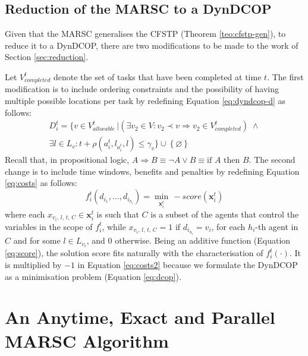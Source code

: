 \subsection{Reduction of the MARSC to a DynDCOP}\label{sec:reduction2}

Given that the MARSC generalises the CFSTP (Theorem \ref{teo:cfstp-gen}), to reduce it to
a DynDCOP, there are two modifications to be made to the work of Section
\ref{sec:reduction}.

Let $V^t_{completed}$ denote the set of tasks that have been completed at time $t$. The
first modification is to include ordering constraints and the possibility of having
multiple possible locations per task by redefining Equation \ref{eq:dyndcop-d} as follows:
\begin{equation}
    \begin{gathered}
    D_i^t = \big\{
        v \in V^t_{allocable} \,|
        \left(\exists v_2 \in V : v_2 \prec v \Rightarrow v_2 \in V^t_{completed} \right)
        \;\land\\ \exists l \in L_v : t + \rho(a_i^t, l_{a_i^t}, l) \leq \gamma_v \big\}
        \cup \left\{ \varnothing \right\}
    \end{gathered}
\end{equation}
Recall that, in propositional logic, $A \Rightarrow B \equiv \neg A \lor B \equiv
\text{if } A \text{ then } B$.
The second change is to include time windows, benefits and penalties by redefining
Equation \ref{eq:costs} as follows:
\begin{equation}\label{eq:costs2}
    f_i^t(d_{i_1}, \dots, d_{i_{h_i}}) = \min_{\bm{x}_i^t}\, - score(\bm{x}_i^t)
\end{equation}
where each $x_{v_i,\, l,\, t,\, C} \in \bm{x}_i^t$ is such that $C$ is a subset of the
agents that control the variables in the scope of $f_i^t$, while $x_{v_i,\, l,\, t,\, C} =
1$ if $d_{i_{h_i}} = v_i$, for each $h_i$-th agent in $C$ and for some $l \in L_{v_i}$,
and $0$ otherwise.
Being an additive function (Equation \ref{eq:score}), the solution score fits naturally
with the characterisation of $f_i^t(\cdot)$. It is multiplied by $-1$ in Equation
\ref{eq:costs2} because we formulate the DynDCOP as a minimisation problem (Equation
\ref{eq:dcop}).

\section{An Anytime, Exact and Parallel MARSC Algorithm}\label{sec:ant}

